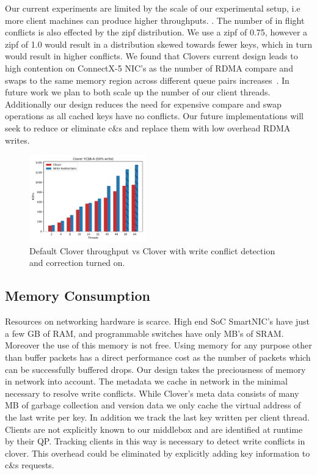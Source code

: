 Our current experiments are limited by the scale of our experimental
setup, i.e more client machines can produce higher throughputs.
. 
The number of in flight conflicts is also effected by the zipf
distribution. We use a zipf of 0.75, however a zipf of 1.0 would
result in a distribution skewed towards fewer keys, which in turn
would result in higher conflicts. We found that Clovers current design
leads to high contention on ConnectX-5 NIC's as the number of RDMA
compare and swaps to the same memory region across different queue
pairs increases~\cite{design-guidelines}. In future work we plan to
both scale up the number of our client threads. Additionally our
design reduces the need for expensive compare and swap operations as
all cached keys have no conflicts. Our future implementations will
seek to reduce or eliminate c\&s and replace them with low overhead
RDMA writes.

\begin{figure}
    \includegraphics[width=0.45\textwidth]{fig/throughput.pdf}
    \caption{Default Clover throughput vs Clover with write conflict
    detection and correction turned on.}
    \label{fig:throughput}
\end{figure}

\subsection{Memory Consumption}

Resources on networking hardware is scarce. High end SoC SmartNIC's
have just a few GB of RAM, and programmable switches have only MB's of
SRAM. Moreover the use of this memory is not free. Using memory for
any purpose other than buffer packets has a direct performance cost as
the number of packets which can be successfully buffered drops. Our
design takes the preciousness of memory in network into account. The
metadata we cache in network in the minimal necessary to resolve write
conflicts. While Clover's meta data consists of many MB of garbage
collection and version data we only cache the virtual address of the
last write per key. In addition we track the last key written per
client thread. Clients are not explicitly known to our middlebox and
are identified at runtime by their QP. Tracking clients in this way is
necessary to detect write conflicts in clover. This overhead could be
eliminated by explicitly adding key information to c\&s requests.

